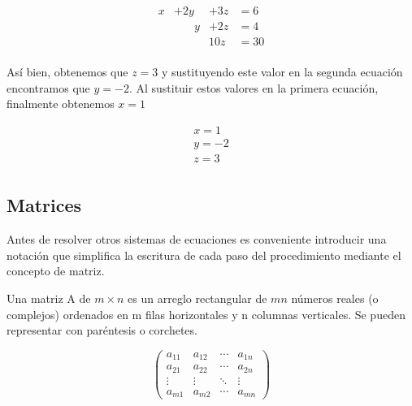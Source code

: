 \documentclass{article}
\begin{document}
\begin{equation*}
    \begin{aligned}
            x & +2y & + 3z &= 6\\
            &\phantom{-98} y & + 2z &= 4\\
            & & 10z &= 30\\
    \end{aligned}
\end{equation*}

Así bien, obtenemos que $z=3$ y sustituyendo este valor en la segunda ecuación encontramos que $y=-2$. Al sustituir estos valores en la primera ecuación, finalmente obtenemos $x=1$ 

\begin{equation*}
    \begin{aligned}
            x = 1 \\
            y = -2\\
            z = 3\\
    \end{aligned}
\end{equation*}

\pagebreak

\subsection{Matrices}

Antes de resolver otros sistemas de ecuaciones es conveniente introducir una notación que simplifica la escritura de cada paso del procedimiento mediante el concepto de matriz.

\begin{tcolorbox}[colback=blue!10!white,colframe=blue!60!black,title=Definición]
    Una matriz A de $m \times n$ es un arreglo rectangular de $mn$ números reales (o complejos) ordenados en m filas horizontales y n columnas verticales. Se pueden representar con paréntesis o corchetes.
\end{tcolorbox}

\begin{equation*}
    \begin{pmatrix}
            a_{11} & a_{12} & \dotsb & a_{1n}\\
            a_{21} & a_{22} & \dotsb & a_{2n}\\
            \vdots & \vdots & \ddots & \vdots\\
            a_{m1} & a_{m2} & \dotsb & a_{mn}
    \end{pmatrix}
\end{equation*}
\end{document}
